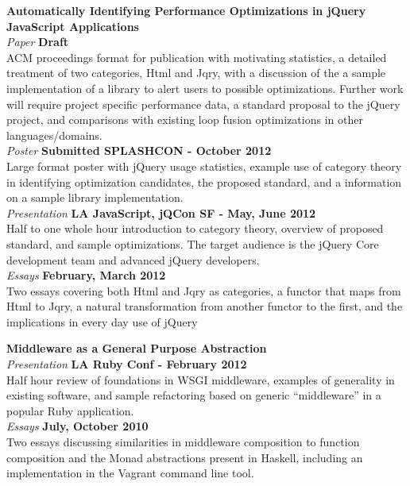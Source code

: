 \documentclass[margin,line]{resume}
\begin{document}
\begin{resume}
    \textbf{Automatically Identifying Performance Optimizations in jQuery JavaScript Applications}\vspace{2mm}\\
    \textsl{Paper} \hfill \textbf{Draft}\\
    ACM proceedings format for publication with motivating statistics, a detailed treatment of two categories, Html and Jqry, with a discussion of the a sample implementation of a library to alert users to possible optimizations. Further work will require project specific performance data, a standard proposal to the jQuery project, and comparisons with existing loop fusion optimizations in other languages/domains.\vspace{1mm}\\
    \textsl{Poster} \hfill \textbf{Submitted SPLASHCON - October 2012}\\
    Large format poster with jQuery usage statistics, example use of category theory in identifying optimization candidates, the proposed standard, and a information on a sample library implementation.\vspace{1mm}\\
    \textsl{Presentation} \hfill \textbf{LA JavaScript, jQCon SF - May, June 2012}\\
    Half to one whole hour introduction to category theory, overview of proposed standard, and sample optimizations. The target audience is the jQuery Core development team and advanced jQuery developers.
    \vspace{1mm}\\
    \textsl{Essays} \hfill \textbf{February, March 2012}\\
    Two essays covering both Html and Jqry as categories, a functor that maps from Html to Jqry, a natural transformation from another functor to the first, and the implications in every day use of jQuery

    \textbf{Middleware as a General Purpose Abstraction}\vspace{2mm}\\
    \textsl{Presentation} \hfill \textbf{LA Ruby Conf - February 2012}\\
    Half hour review of foundations in WSGI middleware, examples of generality in existing software, and sample refactoring based on generic ``middleware'' in a popular Ruby application.
    \vspace{1mm}\\
    \textsl{Essays} \hfill \textbf{July, October 2010}\\
    Two essays discussing similarities in middleware composition to function composition and the Monad abstractions present in Haskell, including an implementation in the Vagrant command line tool.\vspace{1mm}\\


\end{resume}
\end{document}
